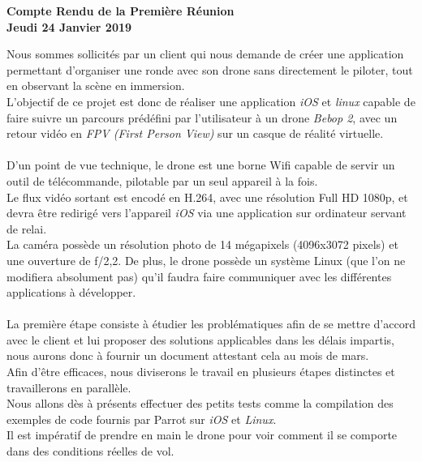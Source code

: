 \documentclass[]{article}
\begin{document}
\pagestyle{fancy}
\renewcommand\headrulewidth{1pt}
\renewcommand\footrulewidth{1pt}

\begin{center}
\large{\textbf{Compte Rendu de la Première Réunion \\ Jeudi 24 Janvier 2019 \bigbreak}}
\end{center}
	
Nous sommes sollicités par un client qui nous demande de créer une application permettant d'organiser une ronde avec son drone sans directement le piloter, tout en observant la scène en immersion. \\
L'objectif de ce projet est donc de réaliser une application \textit{iOS} et \textit{linux} capable de faire suivre un parcours prédéfini par l'utilisateur à un drone \textit{Bebop 2}, avec un retour vidéo en \textit{FPV (First Person View)} sur un casque de réalité virtuelle.\\ \\

D'un point de vue technique, le drone est une borne Wifi capable de servir un outil de télécommande, pilotable par un seul appareil à la fois. \\
Le flux vidéo sortant est encodé en H.264, avec une résolution Full HD 1080p, et devra être redirigé vers l'appareil \textit{iOS} via une application sur ordinateur servant de relai.
\\La caméra possède un résolution photo de 14 mégapixels (4096x3072 pixels) et une ouverture de f/2,2.
De plus, le drone possède un système Linux (que l'on ne modifiera absolument pas) qu'il faudra faire communiquer avec les différentes applications à développer.\\ 
\\

La première étape consiste à étudier les problématiques afin de se mettre d'accord avec le client et lui proposer des solutions applicables dans les délais impartis, nous aurons donc à fournir un document attestant cela au mois de mars. \\
Afin d'être efficaces, nous diviserons le travail en plusieurs étapes distinctes et travaillerons en parallèle.\\
Nous allons dès à présents effectuer des petits tests comme la compilation des exemples de code fournis par Parrot sur \textit{iOS} et \textit{Linux}.\\
Il est impératif de prendre en main le drone pour voir comment il se comporte dans des conditions réelles de vol. 
\\
\\
\end{document}

